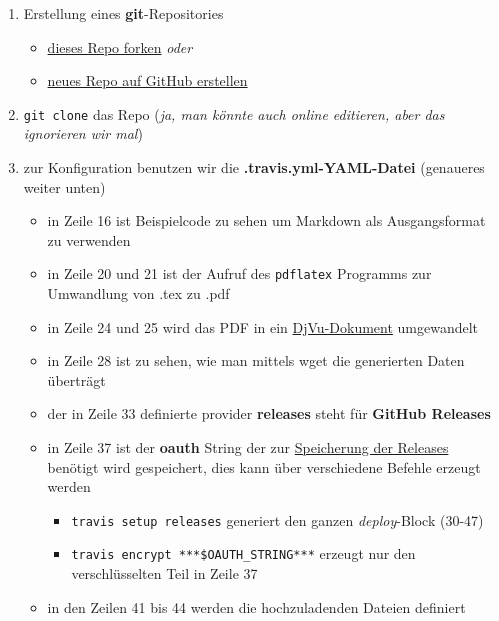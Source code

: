 \documentclass[10pt,a4paper]{article}
\providecommand{\tightlist}{
  \setlength{\itemsep}{0pt}\setlength{\parskip}{0pt}}
\begin{document}
\begin{enumerate}
\def\labelenumi{\arabic{enumi}.}
\tightlist
\item
  Erstellung eines \textbf{git}-Repositories

\begin{itemize}
\tightlist
\item
  \href{https://github.com/SimonWaldherr/golang-examples\#fork-destination-box}{dieses
  Repo forken} \emph{oder}
\item
  \href{https://github.com/new}{neues Repo auf GitHub erstellen}
\end{itemize}

\item
  \texttt{git\ clone} das Repo (\emph{ja, man könnte auch online
  editieren, aber das ignorieren wir mal})
\item
  zur Konfiguration benutzen wir die \textbf{.travis.yml-YAML-Datei}
  (genaueres weiter unten)

\begin{itemize}
\tightlist
\item
  in Zeile 16 ist Beispielcode zu sehen um Markdown als Ausgangsformat
  zu verwenden
\item
  in Zeile 20 und 21 ist der Aufruf des \texttt{pdflatex} Programms zur
  Umwandlung von .tex zu .pdf
\item
  in Zeile 24 und 25 wird das PDF in ein
  \href{https://de.wikipedia.org/wiki/DjVu}{DjVu-Dokument} umgewandelt
\item
  in Zeile 28 ist zu sehen, wie man mittels wget die generierten Daten
  überträgt
\item
  der in Zeile 33 definierte provider \textbf{releases} steht für
  \textbf{GitHub Releases}
\item
  in Zeile 37 ist der \textbf{oauth} String der zur
  \href{http://docs.travis-ci.com/user/deployment/releases/}{Speicherung
  der Releases} benötigt wird gespeichert, dies kann über verschiedene
  Befehle erzeugt werden

  \begin{itemize}
  \tightlist
  \item
    \texttt{travis\ setup\ releases} generiert den ganzen
    \emph{deploy}-Block (30-47)
  \item
    \texttt{travis\ encrypt\ ***\$OAUTH\_STRING***} erzeugt nur den
    verschlüsselten Teil in Zeile 37
  \end{itemize}
\item
  in den Zeilen 41 bis 44 werden die hochzuladenden Dateien definiert
\end{itemize}


\end{enumerate}
\end{document}

